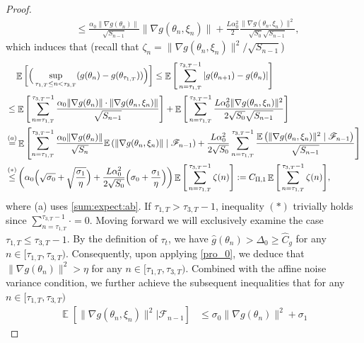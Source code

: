 \documentclass[standalone]{article}
\newcommand{\E}{\mathbb{E}}
\DeclareMathOperator{\Expect}{\mathbb{E}}
\begin{document}
\begin{proof}
\begin{align}
       & \leq \frac{\alpha_{0}\|\nabla g(\theta_{n})\|}{\sqrt{S_{n-1}}} \|\nabla g(\theta_{n},\xi_{n})\|+\frac{ L\alpha_{0}^{2}}{2}\frac{\|\nabla g(\theta_{n},\xi_{n})\|^{2}}{\sqrt{S_0}\sqrt{S_{n-1}}},
   \end{align}
   which induces that (recall that $\zeta_n = \|\nabla g(\theta_{n},\xi_{n})\|^{2}/\sqrt{S_{n-1}}$)
\begin{align}\label{inqu:diff:g:tau1}
&\quad \Expect\bigg[\Big(\sup_{\tau_{1,T}\le n<\tau_{3,T}}(g(\theta_n)-g(\theta_{\tau_{1,T}}))\Big)\bigg]
\le  \Expect\Bigg[\sum_{n=\tau_{1,T}}^{\tau_{3,T}-1}|g(\theta_{n+1})-g(\theta_{n})|\Bigg] \notag\\& \le \Expect\Bigg[\sum_{n=\tau_{1,T}}^{\tau_{3,T}-1}\frac{\alpha_{0}\|\nabla g(\theta_{n})\|\cdot\|\nabla g(\theta_{n},\xi_{n})\|}{\sqrt{S_{n-1}}}\Bigg]+\Expect\Bigg[\sum_{n=\tau_{1,T}}^{\tau_{3,T}-1}\frac{ L\alpha^{2}_{0}\|\nabla g(\theta_{n},\xi_{n})\|^{2}}{2\sqrt{S_0}\sqrt{S_{n-1}}}\Bigg] \notag \\&\mathop{=}^{(a)}\Expect\left[\sum_{n=\tau_{1,T}}^{\tau_{3,T}-1}\frac{\alpha_{0}\|\nabla g(\theta_{n})\|}{\sqrt{S_{n}}}\E\left(\|\nabla g(\theta_{n},\xi_{n})\| \mid \mathscr{F}_{n-1}\right)+\frac{ L\alpha_{0}^{2}}{2\sqrt{S_{0}}}\sum_{n=\tau_{1,T}}^{\tau_{3,T}-1}\frac{\E \left(\|\nabla g(\theta_{n},\xi_{n})\|^{2} \mid \mathscr{F}_{n-1}\right) }{\sqrt{S_{n-1}}}\right]
\notag 
\\&\mathop{\le}^{(*)}\bigg(\alpha_{0}\Big(\sqrt{\sigma_{0}}+\sqrt{\frac{\sigma_{1}}{\eta}}\Big)+\frac{ L\alpha_{0}^{2}}{2\sqrt{S_{0}}}\Big(\sigma_{0}+\frac{\sigma_{1}}{\eta}\Big)\bigg)\Expect\Bigg[\sum_{n=\tau_{1,T}}^{\tau_{3,T}-1}\zeta(n)\Bigg] := C_{\Pi,1}\Expect\Bigg[\sum_{n=\tau_{1,T}}^{\tau_{3,T}-1}\zeta(n)\Bigg],
\end{align}
where (a) uses \cref{sum:expect:ab}.
If $\tau_{1,T} > \tau_{3,T} - 1$, inequality $(*)$ trivially holds since $\sum_{n=\tau_{1,T}}^{\tau_{3,T}-1}\cdot=0$. Moving forward we will exclusively examine the case $\tau_{1,T} \le \tau_{3,T} - 1$. By the definition of $\tau_t$, we have $\hat{g}(\theta_n) > \Delta_0 \geq \hat{C}_g$ for any $n \in [\tau_{1,T}, \tau_{3,T})$. Consequently, upon applying \cref{pro_0}, we deduce that $\|\nabla g(\theta_{n})\|^{2} > \eta$ for any $n \in [\tau_{1,T}, \tau_{3,T})$. Combined with the affine noise variance condition, we further achieve the subsequent inequalities that for any $n\in[\tau_{1,T},\tau_{3,T})$
\begin{align}\label{asddsaasd}
    \Expect[\|\nabla g(\theta_{n},\xi_{n})\|^{2}|\mathscr{F}_{n-1}]&\le {\sigma_{0}}\|\nabla g(\theta_{n})\|^{2}+{\sigma_{1}} 

\end{align}
\end{proof}
\end{document}
